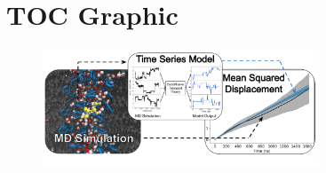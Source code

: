 \documentclass[journal=jctcce,manuscript=article]{achemso}
\begin{document}
  

  \section*{TOC Graphic}
    
  \begin{figure}[!htb]
  \centering
  \includegraphics[width=3.25in]{toc.pdf}
  \end{figure}
\end{document}
